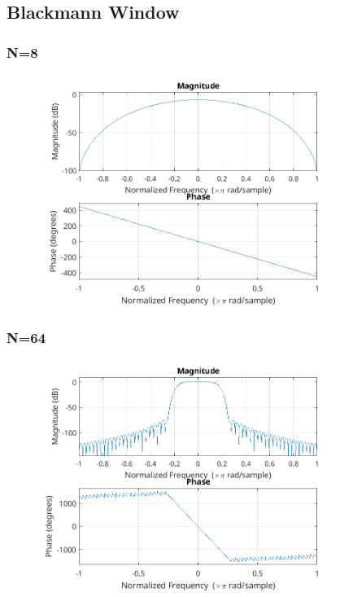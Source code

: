 \documentclass{article}
\begin{document}
\subsection{Blackmann Window}
  \subsubsection{N=8}
  \begin{figure}[!htb]
  \includegraphics[width=10cm]{freqz_bl_8.png}
  \end{figure}

  \subsubsection{N=64}
  \begin{figure}[!htb]
  \includegraphics[width=10cm]{freqz_bl_64.png}
  \end{figure}
\end{document}
